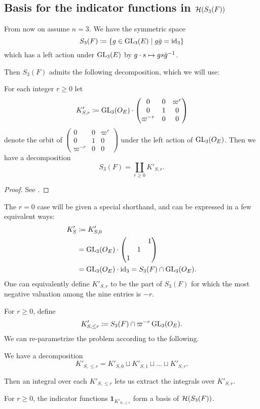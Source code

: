 \subsection{Basis for the indicator functions in $\mathcal H(S_3(F))$}
\label{ch:orbital0_hecke_basis}
From now on assume $n = 3$.
We have the symmetric space
\[ S_3(F) \coloneqq \left\{ g \in \operatorname{GL}_3(E) \mid g \bar{g} = \operatorname{id}_3 \right\} \]
which has a left action under $\operatorname{GL}_3(E)$ by $g \cdot s \mapsto gs\bar{g}^{-1}$.

Then $S_3(F)$ admits the following decomposition, which we will use:
\begin{lemma}
  For each integer $r \ge 0$ let
  \[ K'_{S,r} \coloneqq \operatorname{GL}_3(O_E) \cdot \begin{pmatrix} 0 & 0 & \varpi^r \\ 0 & 1 & 0 \\ \varpi^{-r} & 0 & 0 \end{pmatrix} \]
  denote the orbit of
  $\begin{pmatrix} 0 & 0 & \varpi^r \\ 0 & 1 & 0 \\ \varpi^{-r} & 0 & 0 \end{pmatrix}$
  under the left action of $\operatorname{GL}_3(O_E)$.
  Then we have a decomposition
  \[ S_3(F) = \coprod_{r \geq 0} K'_{S,r}. \]
\end{lemma}
\begin{proof}
  See \cite[\S3]{ref:pacific_offen_sphere}.
\end{proof}

The $r=0$ case will be given a special shorthand,
and can be expressed in a few equivalent ways:
\begin{align*}
  K'_S
  &\coloneqq K'_{S,0} \\
  &= \operatorname{GL}_3(O_E) \cdot \begin{pmatrix} & & 1 \\ & 1 \\ 1 \end{pmatrix} \\
  &= \operatorname{GL}_3(O_E) \cdot \operatorname{id}_3 = S_3(F) \cap \operatorname{GL}_3(O_E).
\end{align*}
One can equivalently define $K'_{S,r}$ to be the part of $S_3(F)$
for which the most negative valuation among the nine entries is $-r$.

For $r \geq 0$, define
\[ K'_{S, \le r} \coloneqq S_3(F) \cap \varpi^{-r} \operatorname{GL}_3(O_E). \]
We can re-parametrize the problem according to the following.
\begin{corollary}
  We have a decomposition
  \[ K'_{S, \le r} = K'_{S,0} \sqcup K'_{S,1} \sqcup \dots \sqcup K'_{S,r}. \]
\end{corollary}
Then an integral over each $K'_{S, \le r}$ lets us extract the integrals over $K'_{S,r}$.
\begin{corollary}
  For $r \ge 0$, the indicator functions $\mathbf{1}_{K'_{S, \le r}}$
  form a basis of $\mathcal H(S_3(F))$.
\end{corollary}

